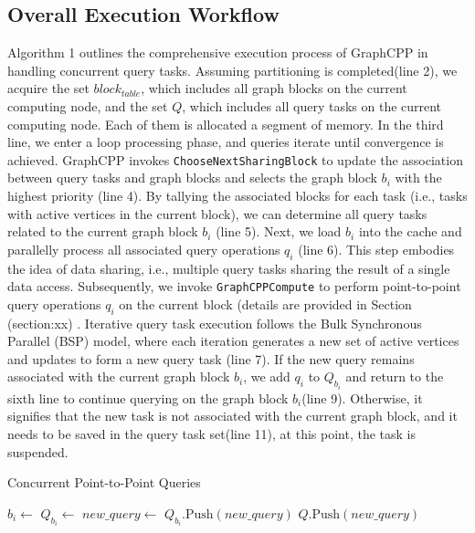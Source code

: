 \documentclass[lettersize,journal]{IEEEtran} %
\begin{document}
\subsection{Overall Execution Workflow}
Algorithm 1 outlines the comprehensive execution process of GraphCPP in handling concurrent query tasks. Assuming partitioning is completed(line 2), we acquire the set \(block_{table}\), which includes all graph blocks on the current computing node, and the set \(Q\), which includes all query tasks on the current computing node. Each of them is allocated a segment of memory. In the third line, we enter a loop processing phase, and queries iterate until convergence is achieved. GraphCPP invokes \texttt{ChooseNextSharingBlock} to update the association between query tasks and graph blocks and selects the graph block \(b_i\) with the highest priority (line 4). By tallying the associated blocks for each task (i.e., tasks with active vertices in the current block), we can determine all query tasks related to the current graph block \(b_i\) (line 5). Next, we load \(b_i\) into the cache and parallelly process all associated query operations \(q_i\) (line 6). This step embodies the idea of data sharing, i.e., multiple query tasks sharing the result of a single data access. Subsequently, we invoke \texttt{GraphCPPCompute} to perform point-to-point query operations \(q_i\) on the current block (details are provided in Section (section:xx) . Iterative query task execution follows the Bulk Synchronous Parallel (BSP) model, where each iteration generates a new set of active vertices and updates to form a new query task (line 7). If the new query remains associated with the current graph block \(b_i\), we add \(q_i\) to \(Q_{b_i}\) and return to the sixth line to continue querying on the graph block \(b_i\)(line 9). Otherwise, it signifies that the new task is not associated with the current graph block, and it needs to be saved in the query task set(line 11), at this point, the task is suspended.

\begin{algorithm}
\caption{Concurrent Point-to-Point Queries}
\label{alg:concurrent_queries}
\begin{algorithmic}[1]

    \State {}
        \State $b_i \gets$ 
        \State $Q_{b_i} \gets$ 
            \State $new\_query \gets$ 
                \State $Q_{b_i}.\text{Push}(new\_query)$
            \Else
                \State $Q.\text{Push}(new\_query)$
            \EndIf
        \EndFor
    \EndWhile
\EndFunction

\end{algorithmic}
\end{algorithm}
  
\end{document}
